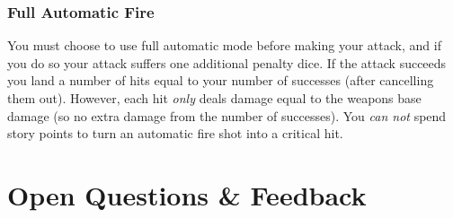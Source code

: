 \subsection{Full Automatic Fire}
You must choose to use full automatic mode before making your attack,
and if you do so your attack suffers one additional penalty dice.
If the attack succeeds you land a number of hits equal to your number of successes (after cancelling them out).
However, each hit \textit{only} deals damage equal to the weapons base damage (so no extra damage from the number of successes).    
You \textit{can not} spend story points to turn an automatic fire shot into a critical hit.

\chapter{Open Questions \& Feedback}
